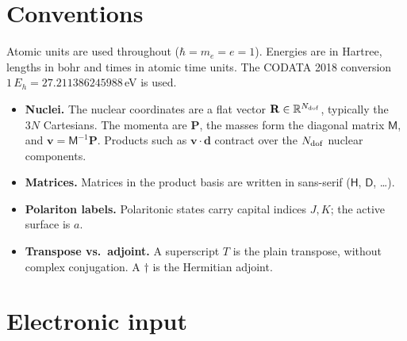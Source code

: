 \documentclass[11pt]{article}
\newcommand{\R}{\mathbf{R}}
\newcommand{\Pv}{\mathbf{P}}
\newcommand{\vv}{\mathbf{v}}
\newcommand{\Mm}{\mathsf{M}}
\newcommand{\dd}{\mathbf{d}}
\newcommand{\Hm}{\mathsf{H}}
\newcommand{\Dm}{\mathsf{D}}
\begin{document}
\section{Conventions}
Atomic units are used throughout ($\hbar=m_e=e=1$). Energies are in Hartree, lengths in bohr and times in atomic time units. The CODATA 2018 conversion $1\,E_h = 27.211386245988$\,eV is used.
\begin{itemize}
\item \textbf{Nuclei.} The nuclear coordinates are a flat vector $\R\in\mathbb{R}^{N_{\rm dof}}$, typically the $3N$ Cartesians. The momenta are $\Pv$, the masses form the diagonal matrix $\Mm$, and $\vv=\Mm^{-1}\Pv$. Products such as $\vv\cdot\dd$ contract over the $N_{\rm dof}$ nuclear components.
\item \textbf{Matrices.} Matrices in the product basis are written in sans-serif ($\Hm$, $\Dm$, \dots).
\item \textbf{Polariton labels.} Polaritonic states carry capital indices $J,K$; the active surface is $a$.
\item \textbf{Transpose vs.\ adjoint.} A superscript $T$ is the plain transpose, without complex conjugation. A $\dagger$ is the Hermitian adjoint.
\end{itemize}

\section{Electronic input}
\end{document}
